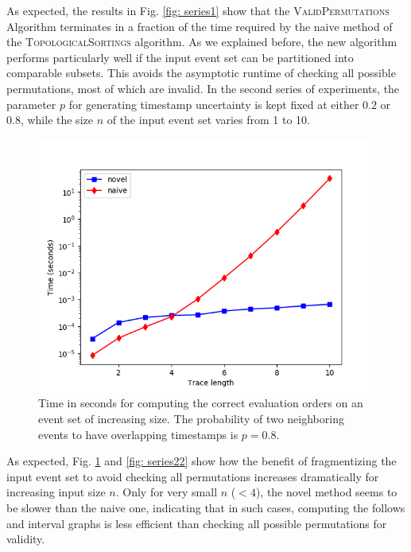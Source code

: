 As expected, the results in Fig. \ref{fig: series1} show that the \textsc{ValidPermutations} Algorithm terminates in a fraction of the time required by the naive method of the \textsc{TopologicalSortings} algorithm.
As we explained before, the new algorithm performs particularly well if the input event set can be partitioned into comparable subsets.
This avoids the asymptotic runtime of checking all possible permutations, most of which are invalid.
In the second series of experiments, the parameter $p$ for generating timestamp uncertainty is kept fixed at either $0.2$ or $0.8$, while the size $n$ of the input event set varies from 1 to 10.
%
%
%
\begin{figure}
	\centering
	\includegraphics[width=0.8\columnwidth]{figures/fixed_p_08_logscale.png}
	\caption{Time in seconds for computing the correct evaluation orders on an event set of increasing size. The probability of two neighboring events to have overlapping timestamps is $p=0.8$.}
	\label{fig: series21}
\end{figure}
%
%
As expected, Fig. \ref{fig: series21} and \ref{fig: series22} show how the benefit of fragmentizing the input event set to avoid checking all permutations increases dramatically for increasing input size $n$.
Only for very small $n$ ($<4$), the novel method seems to be slower than the naive one, indicating that in such cases, computing the follows and interval graphs is less efficient than checking all possible permutations for validity.
%
%
%
